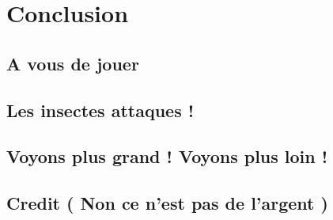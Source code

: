 \documentclass[11pt]{book}
\begin{document}
\chapter{Conclusion}
	\section{A vous de jouer}
	
	\section{Les insectes attaques !}
	
	\section{Voyons plus grand ! Voyons plus loin !}
	
	\section{Credit ( Non ce n'est pas de l'argent )}
\end{document}
